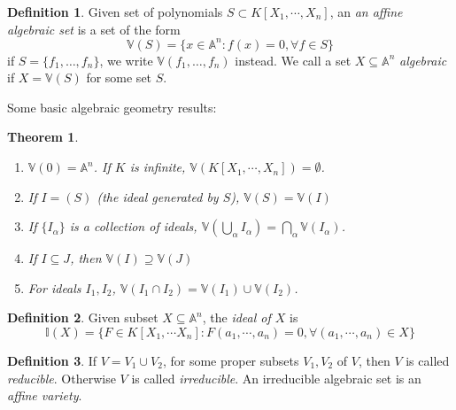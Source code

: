 \documentclass[12pt]{article}
\newtheorem{theorem}{Theorem}[subsection]
\theoremstyle{remark}
\theoremstyle{definition}
\newtheorem{definition}{Definition}[subsection]
\newcommand{\A}[0]{\mathbb{A}}
\newcommand{\Ac}{\mathbb{A}}   %
\begin{document}
        \begin{definition}%
            Given set of polynomials $S \subset K[X_1, \cdots , X_n]$, an \textit{an affine algebraic set} is a set of the form
            $$\mathbb V(S) = \{x \in \Ac^n : f(x) = 0, \forall f \in S\}$$
            if $S = \{f_1,\dots,f_n\}$, we write $\mathbb V(f_1,\dots,f_n)$ instead. We call a set $X\subseteq\A^n$ \textit{algebraic} if $X =\mathbb V(S)$ for some set $S$.
        \end{definition}
        \noindent Some basic algebraic geometry results:
        \begin{theorem}%
            \begin{enumerate}[\normalfont(i)]
                \item $\mathbb V(0) = \Ac^n$. If $K$ is infinite, $\mathbb V(K[X_1, \cdots, X_n]) = \emptyset$.
                \item If $I = (S)$ (the ideal generated by $S$), $\mathbb V(S) = \mathbb V(I)$
                \item If $\{I_\alpha\}$ is a collection of ideals, $\mathbb V(\bigcup_\alpha I_\alpha)=         \bigcap_\alpha \mathbb V(I_\alpha)$. 
                \item If $I \subseteq J$, then $\mathbb V(I) \supseteq \mathbb V(J)$
                \item For ideals $I_1, I_2$, $\mathbb V(I_1 \cap        I_2) = \mathbb V(I_1) \cup \mathbb V(I_2)$. 
            \end{enumerate}
        \end{theorem}
        
        \begin{definition}%
            Given subset $X \subseteq \Ac^n$, the \textit{ideal of $X$} is 
            $$\mathbb I(X) = \{F \in K[X_1, \cdots X_n] : F(a_1, \cdots, a_n)=0, \forall (a_1, \cdots,         a_n) \in X\}$$
        \end{definition}
        
        \begin{definition}%
            If $V = V_1 \cup V_2$, for some proper subsets $V_1, V_2$ of $V$, then $V$ is called \textit{reducible}. Otherwise $V$ is called \textit{irreducible}. An irreducible algebraic set is an \textit{affine variety}. 
        \end{definition}
        
\end{document}
